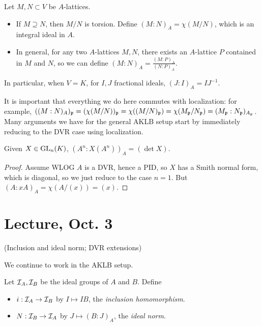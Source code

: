 \documentclass[11pt]{amsart}
\begin{document}
\begin{defn}
Let $M,N \subset V$ be $A$-lattices. 
\begin{itemize}
    \item If $M\supseteq N$, then $M/N$ is torsion. Define $(M:N)_A = \chi(M/N)$, which is an integral ideal in $A$.
    \item In general, for any two $A$-lattices $M,N$, there exists an $A$-lattice $P$ contained in $M$ and $N$, so we can define $(M:N)_A = \frac{(M:P)_A}{(N:P)_A}$.
\end{itemize}
\end{defn}

In particular, when $V = K$, for $I,J$ fractional ideals, $(J:I)_A = IJ^{-1}$.

It is important that everything we do here commutes with localization: for example, $((M:N)_A)_{\mathfrak{p}} = (\chi(M/N))_{\mathfrak{p}} = \chi((M/N)_{\mathfrak{p}}) = \chi(M_{\mathfrak{p}}/N_{\mathfrak{p}}) = (M_{\mathfrak{p}}: N_{\mathfrak{p}})_{A_{\mathfrak{p}}}$. Many arguments we have for the general AKLB setup start by immediately reducing to the DVR case using localization.

\begin{prop}
\label{idealNormDet}
Given $X\in \mathrm{GL}_n(K)$, $(A^n: X(A^n))_A = (\det X)$.
\end{prop}

\begin{proof}
Assume WLOG $A$ is a DVR, hence a PID, so $X$ has a Smith normal form, which is diagonal, so we just reduce to the case $n = 1$. But $(A: xA)_A = \chi(A/(x)) = (x)$.
\end{proof}

\section{Lecture, Oct. 3}
\label{dvrextensions}

(Inclusion and ideal norm; DVR extensions)

We continue to work in the AKLB setup.

\begin{defn}
Let $\mathcal{I}_A, \mathcal{I}_B$ be the ideal groups of $A$ and $B$. Define 
\begin{itemize}
    \item $i: \mathcal{I}_A\to \mathcal{I}_B$ by $I\mapsto IB$, the \emph{inclusion homomorphism}.
    \item $N: \mathcal{I}_B \to \mathcal{I}_A$ by $J\mapsto (B:J)_A$, the \emph{ideal norm}.
\end{itemize}
\end{defn}
\end{document}
